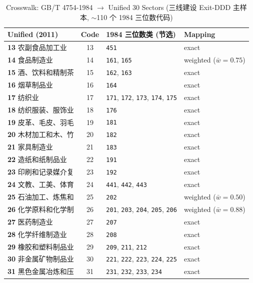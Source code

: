 \begin{table}[htbp]
\centering
\footnotesize
\caption{Crosswalk: GB/T 4754-1984 $\to$ Unified 30 Sectors (三线建设 Exit-DDD 主样本, $\sim$110 个 1984 三位数代码)}
\label{tab:crosswalk_1984}
\begin{tabular}{l c l l}
\toprule
Unified (2011) & Code & 1984 三位数类 (节选) & Mapping \\
\midrule
\textbf{13} 农副食品加工业 & 13 & \texttt{451} & exact \\
\textbf{14} 食品制造业 & 14 & \texttt{161}, \texttt{165} & weighted ($\bar w = 0.75$) \\
\textbf{15} 酒、饮料和精制茶 & 15 & \texttt{162}, \texttt{163} & exact \\
\textbf{16} 烟草制品业 & 16 & \texttt{164} & exact \\
\textbf{17} 纺织业 & 17 & \texttt{171}, \texttt{172}, \texttt{173}, \texttt{174}, \texttt{175} & exact \\
\textbf{18} 纺织服装、服饰业 & 18 & \texttt{176} & exact \\
\textbf{19} 皮革、毛皮、羽毛 & 19 & \texttt{181} & exact \\
\textbf{20} 木材加工和木、竹 & 20 & \texttt{182} & exact \\
\textbf{21} 家具制造业 & 21 & \texttt{183} & exact \\
\textbf{22} 造纸和纸制品业 & 22 & \texttt{191} & exact \\
\textbf{23} 印刷和记录媒介复 & 23 & \texttt{192} & exact \\
\textbf{24} 文教、工美、体育 & 24 & \texttt{441}, \texttt{442}, \texttt{443} & exact \\
\textbf{25} 石油加工、炼焦和 & 25 & \texttt{202} & weighted ($\bar w = 0.50$) \\
\textbf{26} 化学原料和化学制 & 26 & \texttt{201}, \texttt{203}, \texttt{204}, \texttt{205}, \texttt{206} & weighted ($\bar w = 0.88$) \\
\textbf{27} 医药制造业 & 27 & \texttt{207} & exact \\
\textbf{28} 化学纤维制造业 & 28 & \texttt{208} & exact \\
\textbf{29} 橡胶和塑料制品业 & 29 & \texttt{209}, \texttt{211}, \texttt{212} & exact \\
\textbf{30} 非金属矿物制品业 & 30 & \texttt{221}, \texttt{222}, \texttt{223}, \texttt{224}, \texttt{225} & exact \\
\textbf{31} 黑色金属冶炼和压 & 31 & \texttt{231}, \texttt{232}, \texttt{233}, \texttt{234} & exact \\

\end{tabular}
\end{table}
